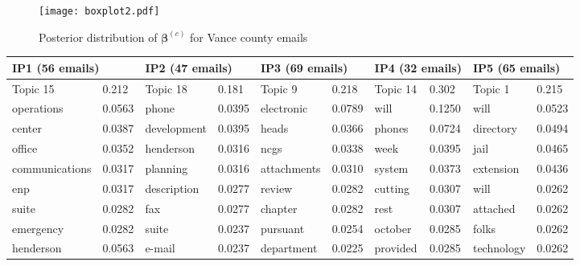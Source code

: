 \documentclass[a4paper]{article}
\begin{document}
\begin{figure}[ht]
	\centering
	\texttt{[image: boxplot2.pdf]} 
	\caption{Posterior distribution of  $\boldsymbol{\beta}^{(c)}$ for Vance county emails}
	\label{fig:boxplot}
\end{figure}
\begin{table}[ht]
	\centering
	\begin{tabular}{|l|l||l|l||l|l||l|l||l|l|}
		\hline
		\multicolumn{2}{|l||}{\textbf{IP1} (56 emails)}&\multicolumn{2}{l||}{\textbf{IP2} (47 emails)}&\multicolumn{2}{l||}{\textbf{IP3} (69 emails)}&\multicolumn{2}{l||}{\textbf{IP4} (32 emails)}&\multicolumn{2}{l|}{\textbf{IP5} (65 emails)}\\
		\hline\hline
		Topic 15&0.212&Topic 18&0.181&Topic 9 &0.218 & Topic 14 & 0.302 & Topic 1 & 0.215 \\
		\hline
		\scriptsize operations&\scriptsize 0.0563&\scriptsize phone&\scriptsize 0.0395&\scriptsize electronic&\scriptsize 0.0789&\scriptsize will&\scriptsize 0.1250&\scriptsize will&\scriptsize 0.0523\\
		\scriptsize center&\scriptsize 0.0387&\scriptsize development&\scriptsize  0.0395&\scriptsize heads&\scriptsize 0.0366&\scriptsize phones&\scriptsize 0.0724&\scriptsize directory&\scriptsize 0.0494\\
		\scriptsize office&\scriptsize  0.0352&\scriptsize henderson&\scriptsize 0.0316&\scriptsize ncgs&\scriptsize 0.0338&\scriptsize week&\scriptsize 0.0395&\scriptsize jail&\scriptsize 0.0465\\
		\scriptsize communications&\scriptsize 0.0317&\scriptsize planning&\scriptsize 0.0316&\scriptsize attachments&\scriptsize 0.0310&\scriptsize system&\scriptsize 0.0373&\scriptsize extension&\scriptsize 0.0436\\
		\scriptsize enp&\scriptsize 0.0317&\scriptsize description&\scriptsize  0.0277&\scriptsize review&\scriptsize 0.0282&\scriptsize cutting&\scriptsize 0.0307&\scriptsize will&\scriptsize 0.0262\\
		\scriptsize suite&\scriptsize 0.0282&\scriptsize fax&\scriptsize 0.0277&\scriptsize chapter&\scriptsize 0.0282&\scriptsize rest&\scriptsize 0.0307&\scriptsize attached&\scriptsize 0.0262\\
		\scriptsize emergency&\scriptsize 0.0282&\scriptsize suite&\scriptsize 0.0237&\scriptsize pursuant&\scriptsize 0.0254&\scriptsize october&\scriptsize 0.0285&\scriptsize folks&\scriptsize 0.0262\\
		\scriptsize henderson&\scriptsize 0.0563&\scriptsize e-mail&\scriptsize 0.0237&\scriptsize department&\scriptsize 0.0225&\scriptsize provided&\scriptsize 0.0285&\scriptsize technology&\scriptsize 0.0262\\

\end{tabular}
\end{table}
\end{document}

